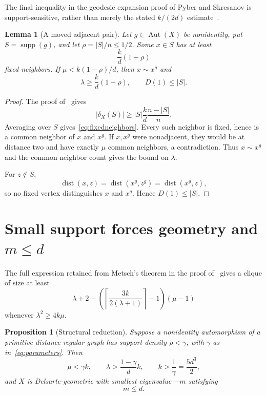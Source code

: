 \documentclass[11pt]{amsart}
\newtheorem{proposition}[theorem]{Proposition}
\newtheorem{lemma}[theorem]{Lemma}
\theoremstyle{definition}
\newcommand{\supp}{\operatorname{supp}}
\newcommand{\dist}{\operatorname{dist}}
\newcommand{\Aut}{\operatorname{Aut}}
\newcommand{\gam}{\gamma}
\begin{document}
The final inequality in the geodesic expansion proof of Pyber and Skresanov is support-sensitive, rather than merely the stated $k/(2d)$ estimate~\cite[Proposition 2.8]{PS}.

\begin{lemma}[A moved adjacent pair]\label{lem:adjacent}
Let $g\in\Aut(X)$ be nonidentity, put $S=\supp(g)$, and let $\rho=|S|/n\le1/2$.  Some $x\in S$ has at least
\begin{equation}\label{eq:fixedneighbors}
 \frac{k}{d}(1-\rho)
\end{equation}
fixed neighbors.  If $\mu<k(1-\rho)/d$, then $x\sim x^g$ and
\begin{equation}\label{eq:adjacentconsequences}
 \lambda\ge\frac{k}{d}(1-\rho),
 \qquad D(1)\le |S|.
\end{equation}
\end{lemma}

\begin{proof}
The proof of~\cite[Proposition 2.8]{PS} gives
\[
 |\delta_X(S)|\ge |S|\frac{k}{d}\frac{n-|S|}{n}.
\]
Averaging over $S$ gives~\eqref{eq:fixedneighbors}.  Every such neighbor is fixed, hence is a common neighbor of $x$ and $x^g$.  If $x,x^g$ were nonadjacent, they would be at distance two and have exactly $\mu$ common neighbors, a contradiction.  Thus $x\sim x^g$ and the common-neighbor count gives the bound on $\lambda$.

For $z\notin S$,
\[
 \dist(x,z)=\dist(x^g,z^g)=\dist(x^g,z),
\]
so no fixed vertex distinguishes $x$ and $x^g$.  Hence $D(1)\le|S|$.
\end{proof}

\section{Small support forces geometry and $m\le d$}
The full expression retained from Metsch's theorem in the proof of~\cite[Proposition 2.6]{PS} gives a clique of size at least
\begin{equation}\label{eq:Metsch}
 \lambda+2-
 \left(\left\lceil\frac{3k}{2(\lambda+1)}\right\rceil-1\right)(\mu-1)
\end{equation}
whenever $\lambda^2\ge4k\mu$.

\begin{proposition}[Structural reduction]\label{prop:structure}
Suppose a nonidentity automorphism of a primitive distance-regular graph has support density $\rho<\gam$, with $\gam$ as in~\eqref{eq:parameters}.  Then
\begin{equation}\label{eq:structuraldata}
 \mu<\gam k,\qquad
 \lambda>\frac{1-\gam}{d}k,\qquad
 k>\frac1\gam=\frac{5d^3}{2},
\end{equation}
and $X$ is Delsarte-geometric with smallest eigenvalue $-m$ satisfying
\begin{equation}\label{eq:mleqd}
 m\le d.
\end{equation}
\end{proposition}
\end{document}
